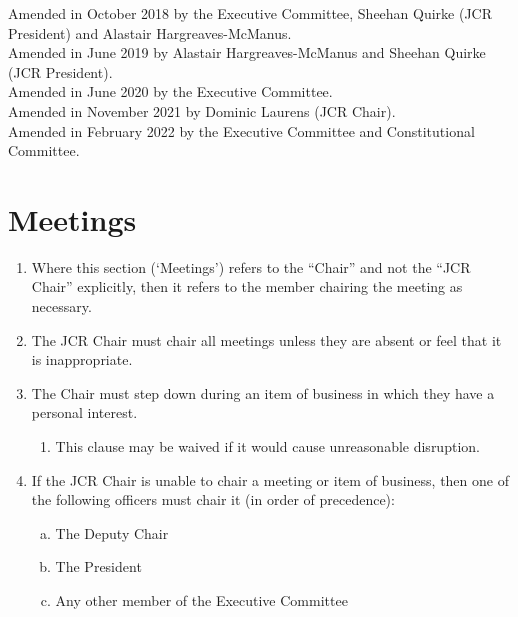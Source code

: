 \documentclass[12pt]{article}
\begin{document}
Amended in October 2018 by the Executive Committee, Sheehan Quirke (JCR President) and Alastair Hargreaves-McManus.\\
Amended in June 2019 by Alastair Hargreaves-McManus and Sheehan Quirke (JCR President).\\
Amended in June 2020 by the Executive Committee.\\
Amended in November 2021 by Dominic Laurens (JCR Chair).\\
Amended in February 2022 by the Executive Committee and Constitutional Committee.

\newpage
\tableofcontents{}
\newpage


\section{Meetings}
\begin{enumerate}
    \subsection{The Chair}
    \item Where this section (‘Meetings’) refers to the “Chair” and not the “JCR Chair” explicitly, then it refers to the member chairing the meeting as necessary.
    \item The JCR Chair must chair all meetings unless they are absent or feel that it is inappropriate.
    \item The Chair must step down during an item of business in which they have a personal interest.
    \begin{enumerate}
        \item This clause may be waived if it would cause unreasonable disruption.
    \end{enumerate}
    \item If the JCR Chair is unable to chair a meeting or item of business, then one of the following officers must chair it (in order of precedence):
    \begin{enumerate}[(a)]
        \item The Deputy Chair
        \item The President
        \item Any other member of the Executive Committee
    \end{enumerate}

\end{enumerate}
\end{document}
